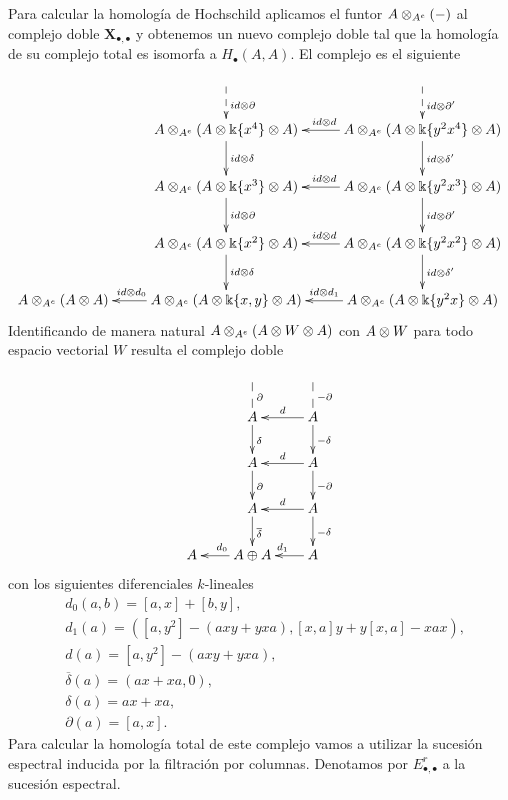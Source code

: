 \documentclass[fleqn,../tesis.tex]{subfiles}
\begin{document}
Para calcular la homología de Hochschild aplicamos el funtor $A \otimes_{A^e}(-)$ al complejo doble $\mathbf{X}_{\bullet,\bullet}$ y obtenemos un nuevo
complejo doble tal que la homología de su complejo total es isomorfa a $H_{\bullet}(A, A)$. El complejo es el siguiente
\begin{align*}
\xymatrix{
	& & \\
	& A \ox_{A^e} (A \ox \field\{x^4\} \ox A) \ar[d]^{id\ox\delta} \ar@{<--}[u]_{id\ox\partial}
		& A \ox_{A^e} (A \ox \field\{y^2x^4\} \ox A) \ar[l]_{id\ox d} \ar[d]^{id\ox\delta'} \ar@{<--}[u]_{id\ox\partial'} \\
	& A \ox_{A^e} (A \ox \field\{x^3\} \ox A) \ar[d]^{id\ox\partial}
		& A \ox_{A^e} (A \ox \field\{y^2x^3\} \ox A) \ar[l]_{id\ox d} \ar[d]^{id\ox\partial'} \\
	& A \ox_{A^e} (A \ox \field\{x^2\} \ox A) \ar[d]^{id\ox\delta}
		& A \ox_{A^e} (A \ox \field \{y^2x^2\} \ox A) \ar[l]_{id\ox d} \ar[d]^{id\ox\delta'} \\
	A \ox_{A^e} (A \ox A) & A \ox_{A^e} (A \ox \field\{x, y\} \ox A) \ar[l]_(.58){id\ox d_0} & A \ox_{A^e} (A \ox \field \{y^2x\} \ox A) \ar[l]_{id\ox d_1} \\
}
\end{align*}
Identificando de manera natural $A \otimes_{A^e} (A \otimes W \otimes A)$ con $A \otimes W$ para todo espacio vectorial $W$ resulta
el complejo doble
\begin{align*}
\xymatrix@=2em{
	& & \\
	& A \ar[d]^{\delta} \ar@{--}[u]_{\partial} & A\ar[l]_{d} \ar[d]^{-\delta} \ar@{--}[u]_{-\partial} \\
	& A \ar[d]^{\partial} & A \ar[l]_{d} \ar[d]^{-\partial} \\
	& A \ar[d]^{\overline{\delta}} & A \ar[l]_{d} \ar[d]^{-\delta} \\
	A & A \oplus A \ar[l]_{d_0} & A \ar[l]_{d_1} \\
}
\end{align*}
con los siguientes diferenciales $k$-lineales
\begin{align*}
&d_0(a,b) = \left[a,x\right] + \left[b,y\right],\\
&d_1(a) = \left([a,y^2] - (axy + yxa), [x,a]y + y\left[x,a\right] - xax\right),\\
&d(a) = [a,y^2] - (axy + yxa),\\
&\overline{\delta}(a) = (ax + xa, 0),\\
&\delta(a) = ax + xa,\\
&\partial(a) = \left[a, x\right].
\end{align*}
Para calcular la homología total de este complejo vamos a utilizar la sucesión espectral inducida por la filtración por columnas.
Denotamos por $E_{\bullet, \bullet}^{r}$ a la sucesión espectral.
\end{document}

